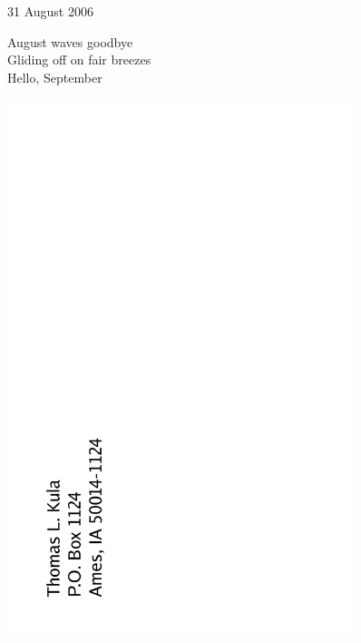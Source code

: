 \documentclass[12pt]{article}
\begin{document}
31 August 2006

August waves goodbye \\
Gliding off on fair breezes \\
Hello, September


\newpage

\includegraphics[width=101mm]{backpage.png}
\end{document}

